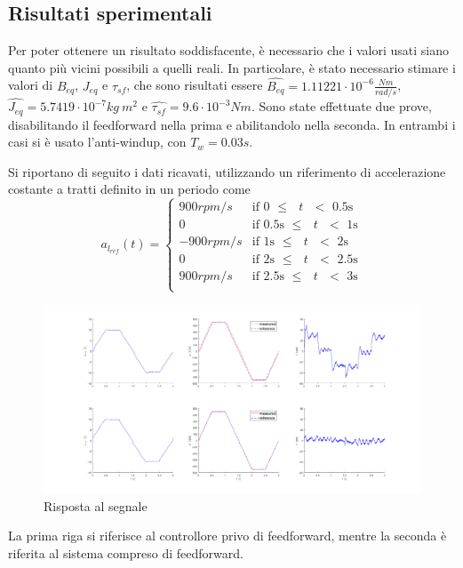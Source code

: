 \documentclass[a4paper, 11pt, Arial]{article}
\begin{document}
\subsection{Risultati sperimentali}
Per poter ottenere un risultato soddisfacente, è necessario che i valori usati siano quanto più vicini possibili a quelli reali. In particolare, è stato necessario stimare i valori di $B_{eq}$, $J_{eq}$ e $\tau_{sf}$, che sono risultati essere $\hat{B_{eq}} = 1.11221\cdot 10^{-6} \frac{Nm}{rad/s}$, $\hat{J_{eq}} = 5.7419 \cdot 10^{-7} kg\ m^2$ e $\hat{\tau_{sf}} = 9.6 \cdot 10^{-3} Nm$. Sono state effettuate due prove, disabilitando il feedforward nella prima e abilitandolo nella seconda. In entrambi i casi si è usato l'anti-windup, con $T_{w} = 0.03s$.

Si riportano di seguito i dati ricavati, utilizzando un riferimento di accelerazione costante a tratti definito in un periodo come
\begin{equation}
    a_{l_{ref}}(t) = 
    \begin{cases}
        900 rpm/s & \text{if 0 $\le$ $t$ $<$ 0.5s}\\
        0 & \text{if 0.5s $\le$ $t$ $<$ 1s}\\
        -900 rpm/s & \text{if 1s $\le$ $t$ $<$ 2s} \\
        0 & \text{if 2s $\le$ $t$ $<$ 2.5s}\\
        900 rpm/s & \text{if 2.5s $\le$ $t$ $<$ 3s}\\
    \end{cases}
\end{equation}

\begin{figure}[H]
    \centering
    \includegraphics[width=\linewidth]{Images/ff_resp.png}
    \caption{Risposta al segnale}
    \label{ff:step}
\end{figure}
La prima riga si riferisce al controllore privo di feedforward, mentre la seconda è riferita al sistema compreso di feedforward.
\end{document}

